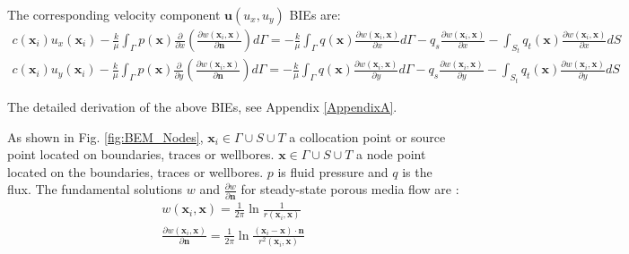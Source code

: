 \documentclass[num-refs]{wiley-networks}
\begin{document}
The corresponding velocity component $\mathbf{u}\left( u_x,u_y \right)$ BIEs are:
\begin{eqnarray}
    c\left( \mathbf{x}_i \right) u_x\left( \mathbf{x}_i \right) -\frac{k}{\mu}\int_{\Gamma}{p\left( \mathbf{x} \right) \frac{\partial}{\partial x}\left( \frac{\partial w\left( \mathbf{x}_i,\mathbf{x} \right)}{\partial \mathbf{n}} \right) d\Gamma}=-\frac{k}{\mu}\int_{\Gamma}{q\left( \mathbf{x} \right) \frac{\partial w\left( \mathbf{x}_i,\mathbf{x} \right)}{\partial x}d\Gamma}
    -q_s\frac{\partial w\left( \mathbf{x}_i,\mathbf{x} \right)}{\partial x}-\int_{S_t}{q_t\left( \mathbf{x} \right) \frac{\partial w\left( \mathbf{x}_i,\mathbf{x} \right)}{\partial x}dS}
    \\
    c\left( \mathbf{x}_i \right) u_y\left( \mathbf{x}_i \right) -\frac{k}{\mu}\int_{\Gamma}{p\left( \mathbf{x} \right) \frac{\partial}{\partial y}\left( \frac{\partial w\left( \mathbf{x}_i,\mathbf{x} \right)}{\partial \mathbf{n}} \right) d\Gamma}=-\frac{k}{\mu}\int_{\Gamma}{q\left( \mathbf{x} \right) \frac{\partial w\left( \mathbf{x}_i,\mathbf{x} \right)}{\partial y}d\Gamma}
    -q_s\frac{\partial w\left( \mathbf{x}_i,\mathbf{x} \right)}{\partial y}-\int_{S_t}{q_t\left( \mathbf{x} \right) \frac{\partial w\left( \mathbf{x}_i,\mathbf{x} \right)}{\partial y}dS}
\end{eqnarray}

The detailed derivation of the above BIEs, see Appendix \ref{AppendixA}.

As shown in Fig. \ref{fig:BEM_Nodes}, $\mathbf{x}_i\in \varGamma \cup S\cup T$ a collocation point or source point located on boundaries, traces or wellbores. $\mathbf{x} \in \varGamma \cup S\cup T$ a node point located on the boundaries, traces or wellbores. $p$ is fluid pressure and $q$ is the flux. The fundamental solutions $w$ and $\frac{\partial w}{\partial \mathbf{n}}$ for steady-state porous media flow are \cite{brebbiaBook1994}: 
\begin{eqnarray}
    w\left( \mathbf{x}_i,\mathbf{x} \right) =\frac{1}{2\pi}\ln \frac{1}{r\left( \mathbf{x}_i,\mathbf{x} \right)}
    \\
    \frac{\partial w\left( \mathbf{x}_i,\mathbf{x} \right)}{\partial \mathbf{n}}=\frac{1}{2\pi}\ln \frac{\left( \mathbf{x}_i-\mathbf{x} \right) \cdot \mathbf{n}}{r^2\left( \mathbf{x}_i,\mathbf{x} \right)}
\label{eq:BEM_kernel}
\end{eqnarray}
\end{document}
